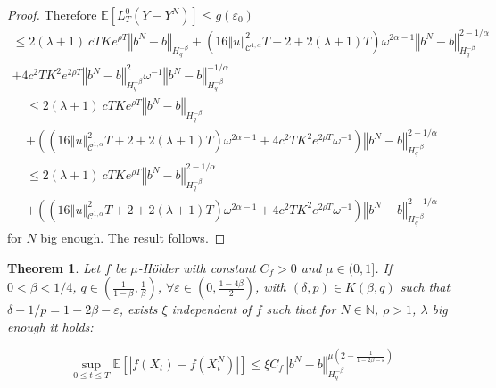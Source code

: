 \documentclass[12pt]{article}
\newtheorem{theo}{Theorem}
\newcommand{\norme}[1]{\left\Vert #1\right\Vert}
\newcommand{\N}{\mathbb{N}}
\newcommand{\E}{\mathbb{E}}
\begin{document}
\begin{proof}
    Therefore $
    \E\left[L^0_T(Y-Y^N)\right]\leq g(\varepsilon_0)
    $
    \begin{multline*}
    \leq 2(\lambda + 1)\ cT Ke^{\rho T}\norme{b^N-b}_{H^{-\beta}_{q}} +\left(16\norme{u}_{\mathcal{C}^{1,\alpha}}^2 T + 2 + 2(\lambda + 1)T\right) \omega^{2\alpha-1} \norme{b^N-b}_{H^{-\beta}_{q}}^{2-1/\alpha}\\+ 4c^2T K^2e^{2\rho T}\norme{b^N-b}_{H^{-\beta}_{q}}^2\omega^{-1}\norme{b^N-b}_{H^{-\beta}_{q}}^{-1/\alpha}
    \end{multline*}    
    \begin{multline*}
    \leq 2(\lambda + 1)\ cT Ke^{\rho T}\norme{b^N-b}_{H^{-\beta}_{q}} \\+\left(\left(16\norme{u}_{\mathcal{C}^{1,\alpha}}^2 T + 2 + 2(\lambda + 1)T\right) \omega^{2\alpha-1} + 4c^2T K^2e^{2\rho T}\omega^{-1}\right)\norme{b^N-b}_{H^{-\beta}_{q}}^{2-1/\alpha}
    \end{multline*}    
    \begin{multline*}
    \leq 2(\lambda + 1)\ cT Ke^{\rho T}\norme{b^N-b}_{H^{-\beta}_{q}}^{2-1/\alpha} \\+\left(\left(16\norme{u}_{\mathcal{C}^{1,\alpha}}^2 T + 2 + 2(\lambda + 1)T\right) \omega^{2\alpha-1} + 4c^2T K^2e^{2\rho T}\omega^{-1}\right)\norme{b^N-b}_{H^{-\beta}_{q}}^{2-1/\alpha}
    \end{multline*}
    for $N$ big enough. The result follows.
\end{proof}

\begin{theo}
    Let $f$ be $\mu$-Hölder with constant $C_f>0$ and $\mu\in(0,1]$. If $0<\beta < 1/4$, $q\in\left(\frac{1}{1-\beta},\frac{1}{\beta}\right)$, $\forall \varepsilon \in(0,\frac{1-4\beta}{2})$, with  $(\delta,p)\in K(\beta,q)$ such that $\delta - 1/p = 1-2\beta - \varepsilon$, exists $\xi$ independent of $f$ such that for $N\in\N$, $\rho>1$, $\lambda$ big enough it holds:
    
    \begin{equation*}
    \underset{0\leq t\leq T} {\sup}\E\left[\left|f\left(X_t\right)-f\left(X_t^N\right)\right|\right] \leq \xi C_f \norme{b^N-b}_{H^{-\beta}_{q}}^{\mu\left(2-\frac{1}{1-2\beta-\varepsilon}\right)}
    \end{equation*}
\end{theo}
\end{document}
